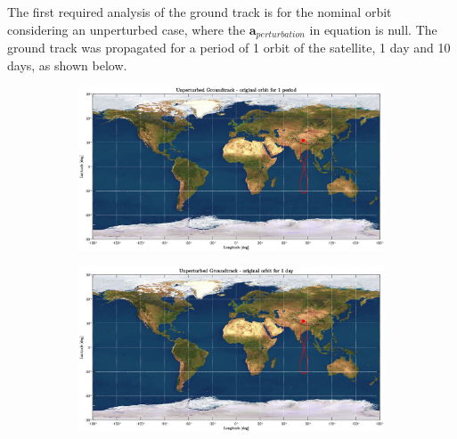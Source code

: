 \documentclass{article}
\begin{document}
The first required analysis of the ground track is for the nominal orbit considering an unperturbed case, where the $\mathbf{a}_{perturbation}$ in equation is null. The ground track was propagated for a period of 1 orbit of the satellite, 1 day and 10 days, as shown below.\\
\begin{figure}[H]
	\centering
	\begin{subfigure}[b]{0.45\textwidth}
		\includegraphics[width=\textwidth]{ug1orb.eps}
		\caption{}
		\label{fig:1a}
	\end{subfigure}
	\hfill
	\begin{subfigure}[b]{0.45\textwidth}
		\includegraphics[width=\textwidth]{ug1d.eps}
		\caption{}
		\label{fig:1b}
	\end{subfigure}
	

\end{figure}
\end{document}
